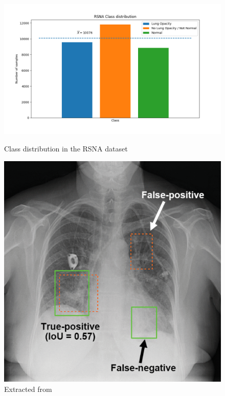 \begin{figure}
	\begin{minipage}[b]{.65\linewidth} %
		\includegraphics[width=\linewidth]{img/rsna_class_distribution.png}
		\caption{Class distribution in the RSNA dataset}
		\label{fig:rsna_classes}
	\end{minipage}
	\begin{minipage}[b]{.35\linewidth} %
		\includegraphics[width=\linewidth]{img/rsna_sample.png}
		\caption{Extracted from \autocite{rsnaSurvey}}
		\label{fig:rsna_sample}
	\end{minipage} 
\end{figure}

